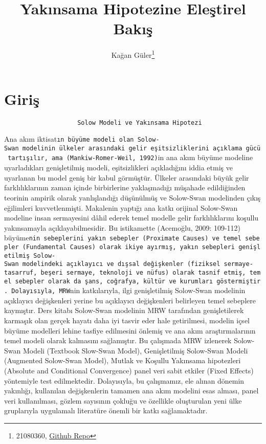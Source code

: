 \documentclass[
  12pt,
]{article}
\title{Yakınsama Hipotezine Eleştirel Bakış}
\author{Kağan Güler\footnote{21080360, \href{https://github.com/kaganglr/AraSinav}{Github Repo}}}
\date{}
\begin{document}
\maketitle

\hypertarget{giriux15f}{%
\section{Giriş}\label{giriux15f}}

\begin{verbatim}
                    Solow Modeli ve Yakınsama Hipotezi
\end{verbatim}

Ana akım iktisat\texttt{ın\ büyüme\ modeli\ olan\ Solow-Swan\ modelinin\ ülkeler\ arasındaki\ gelir\ eşitsizliklerini\ açıklama\ gücü\ tartışılır,\ ama\ (Mankiw-Romer-Weil,\ 1992)}in ana akım büyüme modeline uyarladıkları genişletilmiş modeli, eşitsizlikleri açıkladığını iddia etmiş ve uyarlanan bu model geniş bir kabul görmüştür.
Ülkeler arasındaki büyük gelir farklılıklarının zaman içinde birbirlerine yaklaşmadığı müşahade edildiğinden teorinin ampirik olarak yanlışlandığı düşünülmüş ve Solow-Swan modelinden çıkış eğilimleri kuvvetlenmişti.
Makalenin yaptığı ana katkı orijinal Solow-Swan modeline insan sermayesini dâhil ederek temel modelle gelir farklılıklarını koşullu yakınsamayla açıklayabilmesidir.
Bu istikamette (Acemoğlu, 2009: 109-112) büyüme\texttt{nin\ sebeplerini\ yakın\ sebepler\ (Proximate\ Causes)\ ve\ temel\ sebepler\ (Fundamental\ Causes)\ olarak\ ikiye\ ayırmış,\ yakın\ sebepleri\ genişletilmiş\ Solow-Swan\ modelindeki\ açıklayıcı\ ve\ dışsal\ değişkenler\ (fiziksel\ sermaye-tasarruf,\ beşeri\ sermaye,\ teknoloji\ ve\ nüfus)\ olarak\ tasnif\ etmiş,\ temel\ sebepler\ olarak\ da\ şans,\ coğrafya,\ kültür\ ve\ kurumları\ göstermiştir.\ Dolayısıyla,\ MRW}nin katkılarıyla, ilgi genişletilmiş Solow-Swan modelinin açıklayıcı değişkenleri yerine bu açıklayıcı değişkenleri belirleyen temel sebeplere kaymıştır.
Ders kitabı Solow-Swan modelinin MRW tarafından genişletilerek karmaşık olan gerçek hayatı daha iyi tasvir eder hale getirilmesi, modelin içsel büyüme modelleri lehine tasfiye edilmesini önlemiş ve ana akım araştırmalarının temel modeli olarak kalmasını sağlamıştır.
Bu çalışmada MRW izlenerek Solow-Swan Modeli (Textbook Slow-Swan Model), Genişletilmiş Solow-Swan Modeli (Augmented Solow-Swan Model), Mutlak ve Koşullu Yakınsama hipotezleri (Absolute and Conditional Convergence) panel veri sabit etkiler (Fixed Effects) yöntemiyle test edilmektedir.
Dolayısıyla, bu çalışmamız, ele alınan dönemin yakınlığı, kullanılan değişkenlerin tamamen ana akım modelini esas alması, panel veri kullanılması, gözlem sayısının çokluğu ve özellikle oluşturulan yeni ülke gruplarıyla uygulamalı literatüre önemli bir katkı sağlamaktadır.
\end{document}
